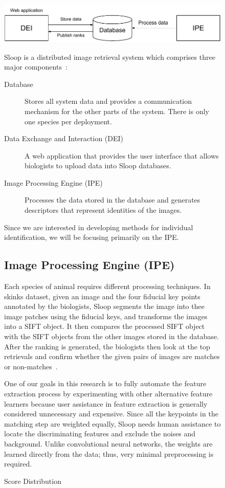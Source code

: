 \begin{figure}[htb] \centering \includegraphics[width=\textwidth]{sloop/system}
\caption{Score Distribution} \label{fig:sloop_overview} %

Sloop is a distributed image retrieval system which comprises three major
components~\cite{sloop14,sloop15,sloopdocs}: \begin{description} \item[Database]
Stores all system data and provides a communication mechanism for the other
parts of the system. There is only one species per deployment.  \item[Data
Exchange and Interaction (DEI)] A web application that provides the user
interface that allows biologists to upload data into Sloop databases.
\item[Image Processing Engine (IPE)] Processes the data stored in the database
and generates descriptors that represent identities of the images.
\end{description} Since we are interested in developing methods for individual
identification, we will be focusing primarily on the IPE.

\subsection{Image Processing Engine (IPE)}

Each species of animal requires different processing techniques.  In skinks
dataset, given an image and the four fiducial key points annotated by the
biologists, Sloop segments the image into thee image patches using the fiducial
keys, and transforms the images into a SIFT object. It then compares the
processed SIFT object with the SIFT objects from the other images stored in the
database. After the ranking is generated, the biologists then look at the top
retrievals and confirm whether the given pairs of images are matches or
non-matches~\cite{sloop14,sloop15}.

One of our goals in this research is to fully automate the feature extraction
process by experimenting with other alternative feature learners because user
assistance in feature extraction is generally considered unnecessary and
expensive. Since all the keypoints in the matching step are weighted equally,
Sloop needs human assistance to locate the discriminating features and exclude
the noises and background. Unlike convolutional neural networks, the weights are
learned directly from the data; thus, very minimal preprocessing is required.


\end{figure}
